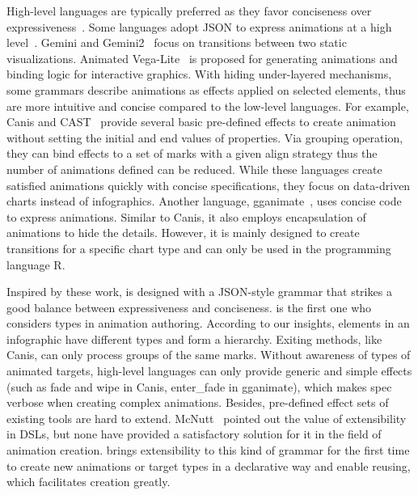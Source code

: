 High-level languages are typically preferred as they favor conciseness over expressiveness~\cite{mcnutt2023nogrammar}. 
Some languages adopt JSON to express animations at a high level~\cite{zong2022animated, kim2020gemini, kim2021gemini, ge2020canis, ge2020canis, ge2021cast}. %
Gemini and Gemini2~\cite{kim2020gemini, kim2021gemini} focus on transitions between two static visualizations. 
Animated Vega-Lite~\cite{zong2022animated} is proposed for generating animations and binding logic for interactive graphics. 
With hiding under-layered mechanisms, some grammars describe animations as effects applied on selected elements, thus are more intuitive and concise compared to the low-level languages.
For example, Canis and CAST~\cite{ge2020canis, ge2021cast} provide several basic pre-defined effects to create animation without setting the initial and end values of properties.
Via grouping operation, they can bind effects to a set of marks with a given align strategy thus the number of animations defined can be reduced.
While these languages create satisfied animations quickly with concise specifications, they focus on data-driven charts instead of infographics.
Another language, gganimate~\cite{gganimate}, uses concise code to express animations.
Similar to Canis, it also employs encapsulation of animations to hide the details.
However, it is mainly designed to create transitions for a specific chart type and can only be used in the programming language R.

Inspired by these work, \gaia{} is designed with a JSON-style grammar that strikes a good balance between expressiveness and conciseness.
\gaia{} is the first one who considers types in animation authoring.
According to our insights, elements in an infographic have different types and form a hierarchy. 
Exiting methods, like Canis, can only process groups of the same marks.
Without awareness of types of animated targets, high-level languages can only provide generic and simple effects (such as fade and wipe in Canis, enter\_fade in gganimate), which makes spec verbose when creating complex animations.
Besides, pre-defined effect sets of existing tools are hard to extend.
McNutt~\cite{mcnutt2023nogrammar} pointed out the value of extensibility in DSLs, but none have provided a satisfactory solution for it in the field of animation creation.
\gaia{} brings extensibility to this kind of grammar for the first time to create new animations or target types in a declarative way and enable reusing, which facilitates creation greatly.